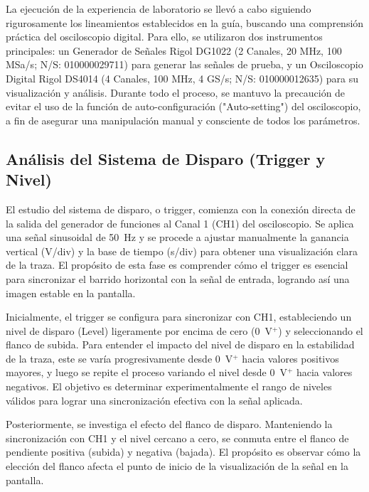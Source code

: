 
La ejecución de la experiencia de laboratorio se llevó a cabo siguiendo rigurosamente los lineamientos establecidos en la guía, buscando una comprensión práctica del osciloscopio digital. Para ello, se utilizaron dos instrumentos principales: un Generador de Señales Rigol DG1022 (2 Canales, 20 MHz, 100 MSa/s; N/S: 010000029711) para generar las señales de prueba, y un Osciloscopio Digital Rigol DS4014 (4 Canales, 100 MHz, 4 GS/s; N/S: 010000012635) para su visualización y análisis. Durante todo el proceso, se mantuvo la precaución de evitar el uso de la función de auto-configuración ("Auto-setting") del osciloscopio, a fin de asegurar una manipulación manual y consciente de todos los parámetros.

\subsection{Análisis del Sistema de Disparo (Trigger y Nivel)}
El estudio del sistema de disparo, o trigger, comienza con la conexión directa de la salida del generador de funciones al Canal 1 (CH1) del osciloscopio. Se aplica una señal sinusoidal de \SI{50}{\hertz} y se procede a ajustar manualmente la ganancia vertical (V/div) y la base de tiempo (s/div) para obtener una visualización clara de la traza. El propósito de esta fase es comprender cómo el trigger es esencial para sincronizar el barrido horizontal con la señal de entrada, logrando así una imagen estable en la pantalla.

Inicialmente, el trigger se configura para sincronizar con CH1, estableciendo un nivel de disparo (Level) ligeramente por encima de cero (\SI{0}{\volt}$^+$) y seleccionando el flanco de subida. Para entender el impacto del nivel de disparo en la estabilidad de la traza, este se varía progresivamente desde \SI{0}{\volt}$^+$ hacia valores positivos mayores, y luego se repite el proceso variando el nivel desde \SI{0}{\volt}$^+$ hacia valores negativos. El objetivo es determinar experimentalmente el rango de niveles válidos para lograr una sincronización efectiva con la señal aplicada.

Posteriormente, se investiga el efecto del flanco de disparo. Manteniendo la sincronización con CH1 y el nivel cercano a cero, se conmuta entre el flanco de pendiente positiva (subida) y negativa (bajada). El propósito es observar cómo la elección del flanco afecta el punto de inicio de la visualización de la señal en la pantalla.

